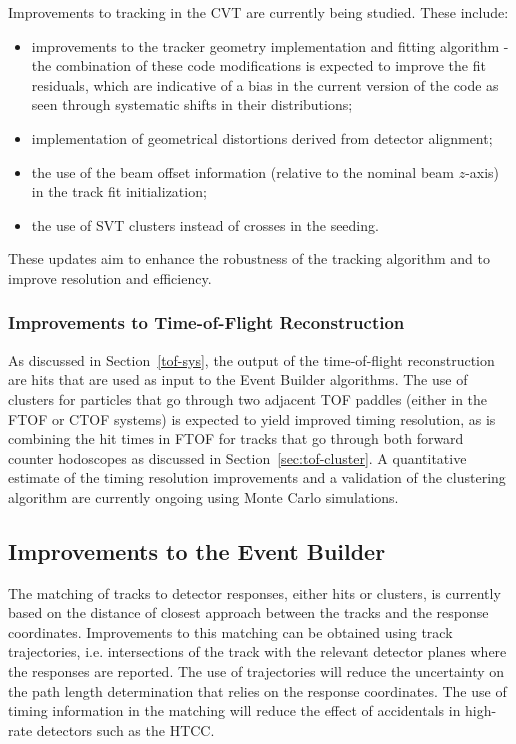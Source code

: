 Improvements to tracking in the CVT are currently being studied. These include:

\begin{itemize}
\item improvements to the tracker geometry implementation and fitting algorithm - the combination of these
  code modifications is expected to improve the fit residuals, which are indicative of a bias in the current
  version of the code as seen through systematic shifts in their distributions;
\item implementation of geometrical distortions derived from detector alignment;
\item the use of the beam offset information (relative to the nominal beam $z$-axis) in the track fit initialization;
\item the use of SVT clusters instead of crosses in the seeding.
\end{itemize}

These updates aim to enhance the robustness of the tracking algorithm and to improve resolution and efficiency.

\subsubsection{Improvements to Time-of-Flight Reconstruction}

As discussed in Section~\ref{tof-sys}, the output of the time-of-flight reconstruction are hits that are used
as input to the Event Builder algorithms. The use of clusters for particles that go through two adjacent TOF
paddles (either in the FTOF or CTOF systems) is expected to yield improved timing resolution, as is combining
the hit times in FTOF for tracks that go through both forward counter hodoscopes as discussed in
Section~\ref{sec:tof-cluster}. A quantitative estimate of the timing resolution improvements and a validation of
the clustering algorithm are currently ongoing using Monte Carlo simulations.

\subsection{Improvements to the Event Builder}

The matching of tracks to detector responses, either hits or clusters, is currently based on the distance of closest
approach between the tracks and the response coordinates. Improvements to this matching can be obtained using
track trajectories, i.e. intersections of the track with the relevant detector planes where the responses are reported.
The use of trajectories will reduce the uncertainty on the path length determination that relies on the response
coordinates. The use of timing information in the matching will reduce the effect of accidentals in high-rate detectors
such as the HTCC.


